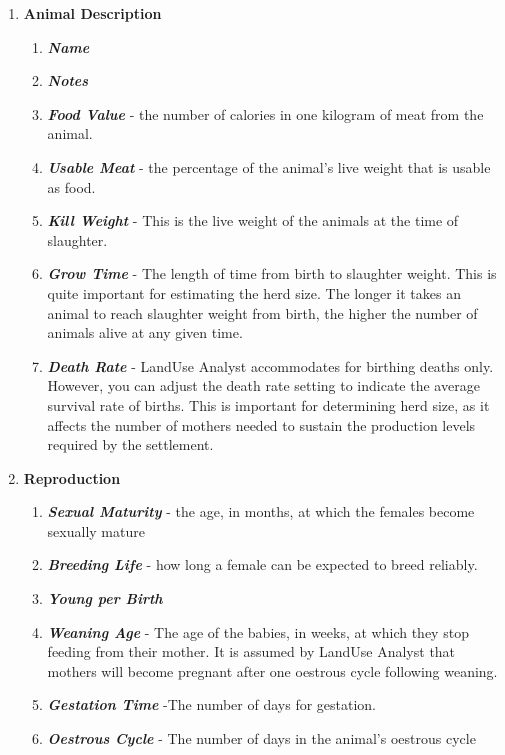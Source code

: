   \begin{enumerate}
    \item \textbf{Animal Description}
      \begin{enumerate}
        \item \textit{\textbf{Name}}
        \item  \textit{\textbf{Notes}}
        \item  \textit\textbf{{Food Value}} - the number
of calories in one kilogram of meat from the animal.
        \item  \textit{\textbf{Usable Meat}} - the percentage of the animal's
live weight that is usable as food.
        \item  \textit{\textbf{Kill Weight}} - This is the live weight of the
animals at the time of slaughter.
        \item  \textit{\textbf{Grow Time}} - The length of time from birth to
slaughter weight.  This is quite important for estimating the herd size. The
longer it takes an animal to reach slaughter weight from birth, the higher the
number of animals alive at any given time.
        \item  \textit{\textbf{Death Rate}} - LandUse Analyst accommodates for
birthing deaths only. However, you can adjust the death
rate setting to indicate the average survival rate of births. This is important
for determining herd size, as it affects the number of mothers needed to sustain
the production levels required by the settlement. 
      \end{enumerate}

    \item \textbf{Reproduction}
      \begin{enumerate}
        \item  \textit{\textbf{Sexual Maturity}} - the age, in
months, at which the females become sexually mature
        \item  \textit\textbf{{Breeding Life}} - how long a female
can be expected to breed reliably.
        \item  \textit{\textbf{Young per Birth}}
        \item  \textit{\textbf{Weaning Age}} - The age of the babies, in weeks,
at which they stop feeding from their mother. It is assumed by LandUse Analyst
that mothers will become pregnant after one oestrous cycle following weaning. 
        \item  \textit{\textbf{Gestation Time}} -The number of days for
gestation. 
        \item  \textit{\textbf{Oestrous Cycle}} - The number of days in the
animal's oestrous cycle
      \end{enumerate}


\end{enumerate}
